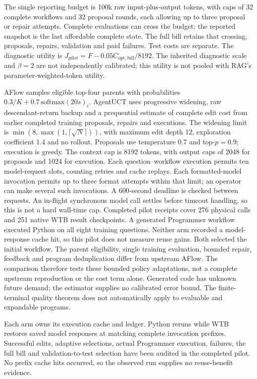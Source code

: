 The single reporting budget is 100k raw input-plus-output tokens, with caps
of 32 complete workflows and 32 proposal rounds, each allowing up to three
proposal or repair attempts. Complete evaluations can cross the budget;
the reported snapshot is the last affordable complete state. The full bill
retains that crossing, proposals, repairs, validation and paid failures.
Test costs are separate. The diagnostic utility is
$J_{\mathrm{pilot}}=F-0.05C_{\mathrm{opt,full}}/8192$.
The inherited diagnostic scale and $\beta=2$ are not independently calibrated;
this utility is not pooled with RAG's parameter-weighted-token utility.

AFlow samples eligible top-four parents with probabilities
$0.3/K+0.7\,\mathrm{softmax}(20s)_i$. AgentUCT uses progressive widening,
raw descendant-return backup and a prequential estimate of complete edit
cost from earlier completed training proposals, repairs and executions.
The widening limit is $\min(8,\max(1,\lceil\sqrt{N}\rceil))$, with maximum
edit depth 12, exploration coefficient 1.4 and no rollout. Proposals use
temperature 0.7 and top-$p=0.9$; execution is greedy. The context cap is 8192
tokens, with output caps of 2048 for proposals and 1024 for execution.
Each question--workflow execution permits ten model-request slots, counting
retries and cache replays. Each formatted-model invocation permits up to three
format attempts within that limit; an operator can make several such invocations.
A 600-second deadline is checked between requests. An in-flight synchronous
model call settles before timeout handling, so this is not a hard wall-time cap.
Completed pilot receipts cover 276 physical calls and 251 native WTB result
checkpoints. A generated Programmer workflow executed Python on all eight
training questions. Neither arm recorded a model-response cache hit, so this
pilot does not measure reuse gains. Both selected the initial workflow.
The parent eligibility, single training evaluation, bounded repair,
feedback and program deduplication differ from upstream AFlow. The comparison
therefore tests these bounded policy adaptations, not a complete upstream
reproduction or the cost term alone. Generated code has unknown future demand;
the estimator supplies no calibrated error bound. The finite-terminal quality
theorem does not automatically apply to evaluable and expandable programs.

Each arm owns its execution cache and ledger. Python reruns while WTB restores
saved model responses at matching complete invocation prefixes. Successful
edits, adaptive selections, actual Programmer execution, failures, the full bill
and validation-to-test selection have been audited in the completed pilot.
No prefix cache hits occurred, so the observed run supplies no reuse-benefit evidence.

